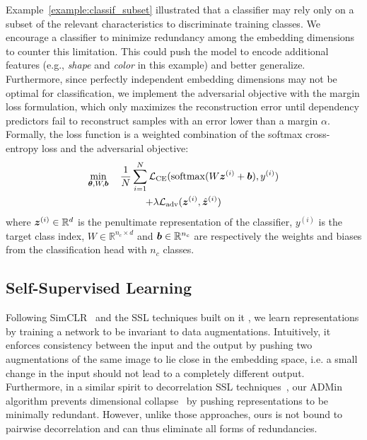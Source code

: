 Example~\ref{example:classif_subset} illustrated that a classifier may rely only on a subset of the relevant characteristics to discriminate training classes. %
We encourage a classifier to minimize redundancy among the embedding dimensions to counter this limitation. This could push the model to encode additional features (e.g., \textit{shape} and \textit{color} in this example) and better generalize. %
Furthermore, since perfectly independent embedding dimensions may not be optimal for classification, we implement the adversarial objective with the margin loss formulation, which only maximizes the reconstruction error until dependency predictors fail to reconstruct samples with an error lower than a margin $\alpha$. 
Formally, the loss function is a weighted combination of the softmax cross-entropy loss and the adversarial objective: 
\begin{multline} \label{eq:cls_min_redund_loss}
    \min_{{\bm{\theta}}, W, {\bm{b}}} \quad \frac{1}{N} \sum_{i=1}^N \mathcal{L}_{\mathrm{CE}}(\mathrm{softmax}(W{\bm{z}}^{(i)} + {\bm{b}}), y^{(i)}) \\ 
    + \lambda \mathcal{L}_{\mathrm{adv}}({\bm{z}}^{(i)}, \hat{{\bm{z}}}^{(i)})
\end{multline}
where ${\bm{z}}^{(i)} \in \mathbb{R}^d$ is the penultimate representation of the classifier, $y^{(i)}$ is the target class index, $W \in \mathbb{R}^{n_c \times d}$ and ${\bm{b}} \in \mathbb{R}^{n_c}$ are respectively the weights and biases from the classification head with $n_c$ classes.

\subsection{Self-Supervised Learning} \label{subsec:ssl_application}

Following SimCLR~\citep{chen2020SimCLR_ssl} and the SSL techniques built on it \citep{zbontar2021barlow_ssl,caron2021DINO_ssl,bardes2021vicreg_ssl}, we learn representations by training a network to be invariant to data augmentations. 
Intuitively, it enforces consistency between the input and the output by pushing two augmentations of the same image to lie close in the embedding space, i.e. a small change in the input should not lead to a completely different output. 
Furthermore, in a similar spirit to decorrelation SSL techniques~\citep{huang2018decorrelated_bn, zbontar2021barlow_ssl}, our ADMin algorithm prevents dimensional collapse~\citep{jing2021understand_ssl_dim_collapse} by pushing representations to be minimally redundant. However, unlike those approaches, ours is not bound to pairwise decorrelation and can thus eliminate all forms of redundancies. 

